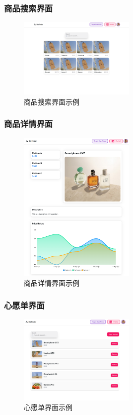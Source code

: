 \subsubsection{商品搜索界面}

\begin{figure}[H]
\centering
\includegraphics[width=0.5\textwidth]{assets/design/searchpage.png}
\caption{商品搜索界面示例}
\end{figure}

\subsubsection{商品详情界面}

\begin{figure}[H]
\centering
\includegraphics[width=0.5\textwidth]{assets/design/productpage.png}
\caption{商品详情界面示例}
\end{figure}

\subsubsection{心愿单界面}

\begin{figure}[H]
\centering
\includegraphics[width=0.5\textwidth]{assets/design/wishlistpage.png}
\caption{心愿单界面示例}
\end{figure}

